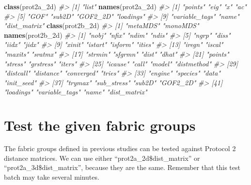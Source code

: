 \documentclass[12pt,]{book}
\newenvironment{Shaded}{\begin{snugshade}}{\end{snugshade}}
\newcommand{\CommentTok}[1]{\textcolor[rgb]{0.56,0.35,0.01}{\textit{#1}}}
\newcommand{\KeywordTok}[1]{\textcolor[rgb]{0.13,0.29,0.53}{\textbf{#1}}}
\newcommand{\NormalTok}[1]{#1}
\begin{document}
\begin{Shaded}
\begin{Highlighting}[]
\KeywordTok{class}\NormalTok{(prot2a_2d)}
\CommentTok{#> [1] "list"}
\KeywordTok{names}\NormalTok{(prot2a_2d)}
\CommentTok{#>  [1] "points"        "eig"           "x"             "ac"           }
\CommentTok{#>  [5] "GOF"           "sub2D"         "GOF2_2D"       "loadings"     }
\CommentTok{#>  [9] "variable_tags" "name"          "dist_matrix"}
\KeywordTok{class}\NormalTok{(prot2b_2d)}
\CommentTok{#> [1] "metaMDS" "monoMDS"}
\KeywordTok{names}\NormalTok{(prot2b_2d)}
\CommentTok{#>  [1] "nobj"          "nfix"          "ndim"          "ndis"         }
\CommentTok{#>  [5] "ngrp"          "diss"          "iidx"          "jidx"         }
\CommentTok{#>  [9] "xinit"         "istart"        "isform"        "ities"        }
\CommentTok{#> [13] "iregn"         "iscal"         "maxits"        "sratmx"       }
\CommentTok{#> [17] "strmin"        "sfgrmn"        "dist"          "dhat"         }
\CommentTok{#> [21] "points"        "stress"        "grstress"      "iters"        }
\CommentTok{#> [25] "icause"        "call"          "model"         "distmethod"   }
\CommentTok{#> [29] "distcall"      "distance"      "converged"     "tries"        }
\CommentTok{#> [33] "engine"        "species"       "data"          "init_seed"    }
\CommentTok{#> [37] "trymax"        "sub_stress"    "sub2D"         "GOF2_2D"      }
\CommentTok{#> [41] "loadings"      "variable_tags" "name"          "dist_matrix"}
\end{Highlighting}
\end{Shaded}

\pagebreak

\hypertarget{test-the-given-fabric-groups}{%
\section{Test the given fabric groups}\label{test-the-given-fabric-groups}}

The fabric groups defined in previous studies can be tested against Protocol 2 distance matrices. We can use either ``prot2a\_2d\$dist\_matrix'' or ``prot2a\_3d\$dist\_matrix'', because they are the same. Remember that this test batch may take several minutes.
\end{document}
